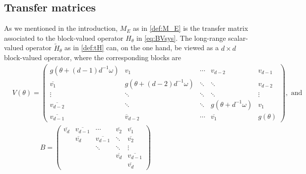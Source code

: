 \documentclass[11pt]{amsart}
\begin{document}
\subsection{Transfer matrices}
As we mentioned in the introduction, $M_E$ as in \eqref{def:M_E} is the transfer matrix associated to the block-valued operator $H_{\theta}$ in \eqref{eq:BVsys}.
The long-range scalar-valued operator $\tilde{H}_{\theta}$ as in \eqref{def:tH} can, on the one hand, be viewed as a $d\times d$ block-valued operator, where the corresponding blocks are
\begin{align}\label{def:tH_BV}
        &V(\theta)=
        \left(\begin{matrix}
g(\theta+(d-1)d^{-1}\omega) &v_1 &\cdots &v_{d-2} &v_{d-1}\\
           \overline{v_1} &g(\theta+(d-2)d^{-1}\omega)&\ddots &\ddots &v_{d-2}\\
\vdots &\ddots &\ddots &\ddots &\vdots          \\
\overline{v_{d-2}} &\ddots &\ddots &g(\theta+d^{-1}\omega) &v_1\\
\overline{v_{d-1}}         &\overline{v}_{d-2} &\cdots &\overline{v_1} &g(\theta)
        \end{matrix}\right), \text{ and } \\
                &\qquad\qquad B=
                \left(\begin{matrix}
\overline{v_d} &\overline{v_{d-1}} &\cdots &\overline{v_2} &\overline{v_1}\\
             &\overline{v_d} &\overline{v_{d-1}} &\ddots &\overline{v_2}\\
& &\ddots &\ddots & \vdots         \\
& & &\overline{v_d} &\overline{v_{d-1}}\\
& & & &\overline{v_d}
        \end{matrix}\right)
    \end{align}
\end{document}

